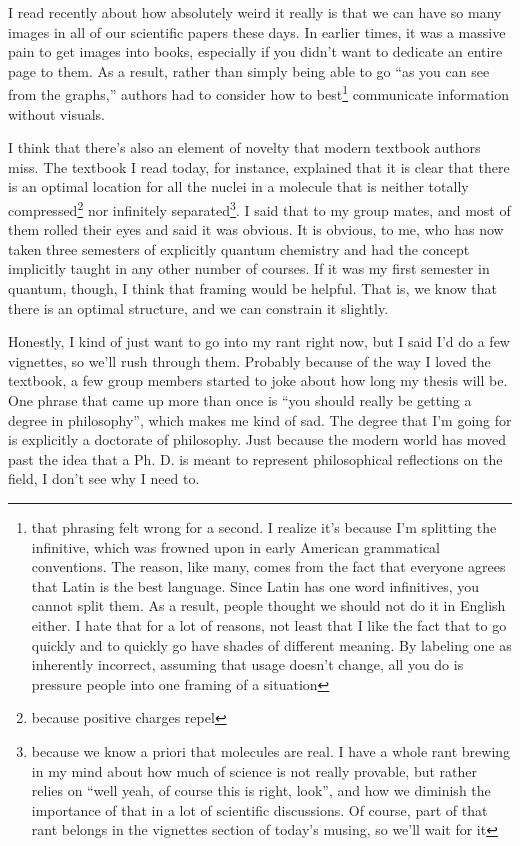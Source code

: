 \documentclass[12pt]{article}[titlepage]
\newcommand{\say}[1]{``#1''}
\newcommand{\1}{\={a}}
\newcommand{\2}{\={e}}
\newcommand{\3}{\={\i}}
\newcommand{\4}{\=o}
\newcommand{\5}{\=u}
\newcommand{\6}{\={A}}
\renewcommand{\,}{\textsuperscript{,}}
\begin{document}
I read recently about how absolutely weird it really is that we can have so many images in all of our scientific papers these days.
In earlier times, it was a massive pain to get images into books, especially if you didn't want to dedicate an entire page to them.
As a result, rather than simply being able to go \say{as you can see from the graphs,} authors had to consider how to best\footnote{that phrasing felt wrong for a second.
I realize it's because I'm splitting the infinitive, which was frowned upon in early American grammatical conventions.
The reason, like many, comes from the fact that everyone agrees that Latin is the best language.
Since Latin has one word infinitives, you cannot split them.
As a result, people thought we should not do it in English either.
I hate that for a lot of reasons, not least that I like the fact that to go quickly and to quickly go have shades of different meaning.
By labeling one as inherently incorrect, assuming that usage doesn't change, all you do is pressure people into one framing of a situation} communicate information without visuals.

I think that there's also an element of novelty that modern textbook authors miss.
The textbook I read today, for instance, explained that it is clear that there is an optimal location for all the nuclei in a molecule that is neither totally compressed\footnote{because positive charges repel} nor infinitely separated\footnote{because we know a priori that molecules are real.
I have a whole rant brewing in my mind about how much of science is not really provable, but rather relies on \say{well yeah, of course this is right, look}, and how we diminish the importance of that in a lot of scientific discussions.
Of course, part of that rant belongs in the vignettes section of today's musing, so we'll wait for it}.
I said that to my group mates, and most of them rolled their eyes and said it was obvious.
It is obvious, to me, who has now taken three semesters of explicitly quantum chemistry and had the concept implicitly taught in any other number of courses.
If it was my first semester in quantum, though, I think that framing would be helpful.
That is, we know that there is an optimal structure, and we can constrain it slightly.

Honestly, I kind of just want to go into my rant right now, but I said I'd do a few vignettes, so we'll rush through them.
Probably because of the way I loved the textbook, a few group members started to joke about how long my thesis will be.
One phrase that came up more than once is \say{you should really be getting a degree in philosophy}, which makes me kind of sad.
The degree that I'm going for is explicitly a doctorate of philosophy.
Just because the modern world has moved past the idea that a Ph. D. is meant to represent philosophical reflections on the field, I don't see why I need to.
\end{document}
